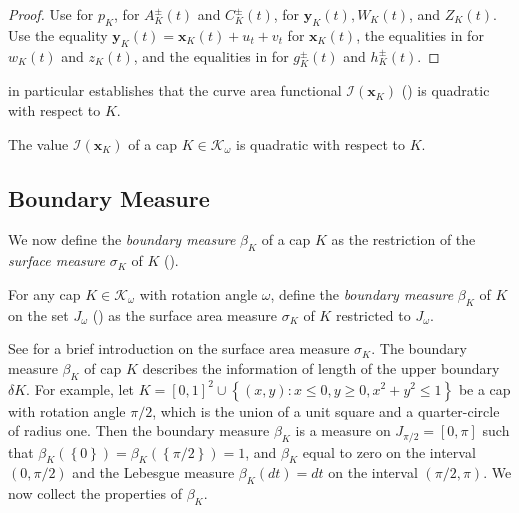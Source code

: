 \begin{proof}
Use  for \(p_K\),  for \(A^{\pm}_K(t)\) and \(C^{\pm}_K(t)\),  for \(\mathbf{y}_K(t), W_K(t)\), and \(Z_K(t)\). Use the equality \(\mathbf{y}_K(t) = \mathbf{x}_K(t) + u_t + v_t\) for \(\mathbf{x}_K(t)\), the equalities in  for \(w_K(t)\) and \(z_K(t)\), and the equalities in  for \(g^{\pm}_K(t)\) and \(h^{\pm}_K(t)\).
\end{proof}

 in particular establishes that the curve area functional \(\mathcal{I}(\mathbf{x}_K)\) () is quadratic with respect to \(K\).

\begin{corollary}

The value \(\mathcal{I}(\mathbf{x}_K)\) of a cap \(K \in \mathcal{K}_\omega\) is quadratic with respect to \(K\).

\label{cor:inner-corner-quadratic}
\end{corollary}

\subsection{Boundary Measure}

We now define the \emph{boundary measure} \(\beta_K\) of a cap \(K\) as the restriction of the \emph{surface measure} \(\sigma_K\) of \(K\) ().

\begin{definition}

For any cap \(K \in \mathcal{K}_\omega\) with rotation angle \(\omega\), define the \emph{boundary measure} \(\beta_K\) of \(K\) on the set \(J_\omega\) () as the surface area measure \(\sigma_K\) of \(K\) restricted to \(J_\omega\).

\label{def:boundary-measure}
\end{definition}

See  for a brief introduction on the surface area measure \(\sigma_K\). The boundary measure \(\beta_K\) of cap \(K\) describes the information of length of the upper boundary \(\delta K\). For example, let \(K = [0, 1]^2 \cup \left\{ (x, y) : x \leq 0, y \geq 0, x^2 + y^2 \leq 1 \right\}\) be a cap with rotation angle \(\pi/2\), which is the union of a unit square and a quarter-circle of radius one. Then the boundary measure \(\beta_K\) is a measure on \(J_{\pi/2} = [0, \pi]\) such that \(\beta_K\left( \left\{ 0 \right\} \right) = \beta_K\left( \left\{ \pi/2 \right\} \right) = 1\), and \(\beta_K\) equal to zero on the interval \((0, \pi/2)\) and the Lebesgue measure \(\beta_K(dt) = dt\) on the interval \((\pi/2, \pi)\). We now collect the properties of \(\beta_K\).

